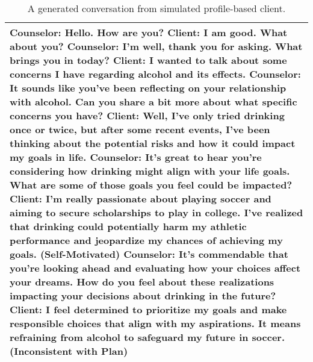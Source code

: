 \begin{table*}[tb]
\begin{tabularx}{\textwidth}{X}
\toprule
Counselor: Hello. How are you? \newline Client: I am good. What about you? \newline
Counselor: I'm well, thank you for asking. What brings you in today? \newline Client: I wanted to talk about some concerns I have regarding alcohol and its effects. \newline
Counselor: It sounds like you've been reflecting on your relationship with alcohol. Can you share a bit more about what specific concerns you have? \newline Client: Well, I've only tried drinking once or twice, but after some recent events, I've been thinking about the potential risks and how it could impact my goals in life. \newline
Counselor: It's great to hear you're considering how drinking might align with your life goals. What are some of those goals you feel could be impacted? \newline
Client: I'm really passionate about playing soccer and aiming to secure scholarships to play in college. {\color{red} I've realized that drinking could potentially harm my athletic performance and jeopardize my chances of achieving my goals.} {\color{red} (Self-Motivated)} \newline
Counselor: It’s commendable that you're looking ahead and evaluating how your choices affect your dreams. How do you feel about these realizations impacting your decisions about drinking in the future? \newline Client: I feel determined to prioritize my goals and make responsible choices that align with my aspirations. It means {\color{red} refraining from alcohol} to safeguard my future in soccer. {\color{red} (Inconsistent with Plan)} \\ \bottomrule
\end{tabularx}
\caption{A generated conversation from simulated profile-based client.}
\label{tab:profile-based conv}
\end{table*}


